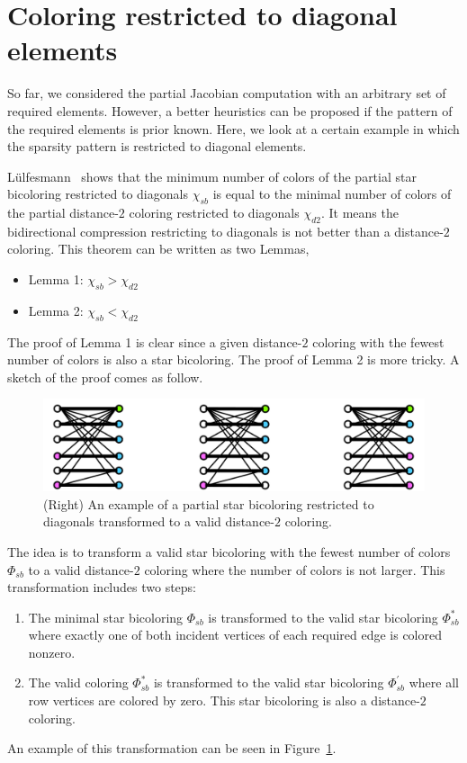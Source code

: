 \documentclass[12pt, twoside,a4paper,toc=bibliography]{scrbook}
\newcommand{\figref}[1]{Figure~\protect\ref{#1}}
\begin{document}
\clearpage
\section{Coloring restricted to diagonal elements}
\label{s.part.color.diag}
So far, we considered the partial Jacobian computation with an arbitrary
set of required elements. However, a better heuristics can be proposed if the
pattern of the required elements is prior known.
Here, we look at a certain example in which the sparsity pattern is restricted to diagonal elements.

Lülfesmann~\cite{Lulfesmann2012Fap} shows that the minimum number of colors of
the partial star bicoloring restricted to diagonals $\chi_{sb}$ is equal to
the minimal number of colors of the partial distance-$2$ coloring restricted
to diagonals $\chi_{d2}$. It means the bidirectional compression restricting to diagonals is not better than
a distance-$2$ coloring. 
This theorem can be written as two Lemmas,
\begin{itemize}
\item Lemma 1: $\chi_{sb} > \chi_{d2}$
\item Lemma 2: $\chi_{sb} < \chi_{d2}$
\end{itemize}
The proof of Lemma 1 is clear since
a given distance-$2$ coloring with the fewest number of colors is also a star bicoloring.
The proof of Lemma 2 is more tricky. A sketch of the proof comes as follow.
\begin{figure}
\includegraphics[width=\linewidth]{proof1.png}
\caption{
(Right) An example of a partial star bicoloring restricted to diagonals
transformed to a valid distance-$2$ coloring.}
\label{proof1}
\end{figure}


The idea is to transform a valid star bicoloring with the fewest number of colors $\Phi_{sb}$ to 
a valid distance-$2$ coloring where the number of colors is not larger.
This transformation includes two steps:
\begin{enumerate}
\item The minimal star bicoloring $\Phi_{sb}$ is transformed 
to the valid star bicoloring $\Phi_{sb}^{*}$ 
where exactly one of both incident vertices of each required edge is colored nonzero.
\item The valid coloring $\Phi_{sb}^{*}$ is transformed 
to the valid star bicoloring $\Phi_{sb}^{'}$ where all row vertices are colored by zero.
This star bicoloring is also a distance-$2$ coloring.
\end{enumerate}
An example of this transformation can be seen in \figref{proof1}. 
\end{document}
